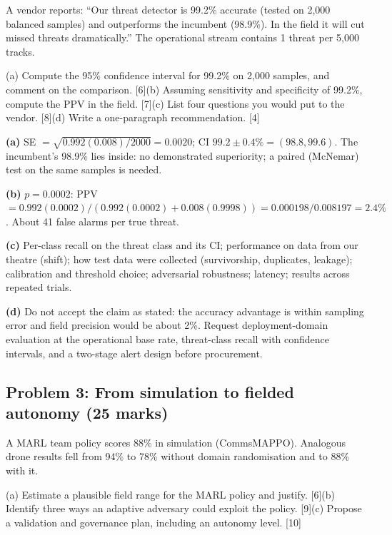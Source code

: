 \documentclass[11pt]{article}
\begin{document}
\begin{prob}A vendor reports: ``Our threat detector is 99.2\% accurate (tested on 2,000 balanced samples) and outperforms the incumbent (98.9\%). In the field it will cut missed threats dramatically.'' The operational stream contains 1 threat per 5,000 tracks.

(a) Compute the 95\% confidence interval for 99.2\% on 2,000 samples, and comment on the comparison. [6]\newline (b) Assuming sensitivity and specificity of 99.2\%, compute the PPV in the field. [7]\newline (c) List four questions you would put to the vendor. [8]\newline (d) Write a one-paragraph recommendation. [4]\end{prob}

\begin{soln}\textbf{(a)} SE $=\sqrt{0.992(0.008)/2000}=0.0020$; CI $99.2\pm0.4\%=(98.8,99.6)$. The incumbent's 98.9\% lies inside: no demonstrated superiority; a paired (McNemar) test on the same samples is needed.

\textbf{(b)} $p=0.0002$: PPV $=0.992(0.0002)/(0.992(0.0002)+0.008(0.9998))=0.000198/0.008197=\mathbf{2.4\%}$. About 41 false alarms per true threat.

\textbf{(c)} Per-class recall on the threat class and its CI; performance on data from our theatre (shift); how test data were collected (survivorship, duplicates, leakage); calibration and threshold choice; adversarial robustness; latency; results across repeated trials.

\textbf{(d)} Do not accept the claim as stated: the accuracy advantage is within sampling error and field precision would be about 2\%. Request deployment-domain evaluation at the operational base rate, threat-class recall with confidence intervals, and a two-stage alert design before procurement.\end{soln}

\subsection{Problem 3: From simulation to fielded autonomy \normalfont\small\color{GreyN}(25 marks)}

\begin{prob}A MARL team policy scores 88\% in simulation (CommsMAPPO). Analogous drone results fell from 94\% to 78\% without domain randomisation and to 88\% with it.

(a) Estimate a plausible field range for the MARL policy and justify. [6]\newline (b) Identify three ways an adaptive adversary could exploit the policy. [9]\newline (c) Propose a validation and governance plan, including an autonomy level. [10]\end{prob}
\end{document}

